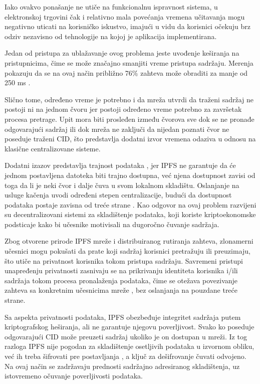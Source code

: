 Iako ovakvo ponašanje ne utiče na funkcionalnu ispravnost sistema, u elektronskoj trgovini čak i relativno mala povećanja vremena učitavanja mogu negativno uticati na korisničko iskustvo, imajući u vidu da korisnici očekuju brz odziv nezavisno od tehnologije na kojoj je aplikacija implementirana.

Jedan od pristupa za ublažavanje ovog problema jeste uvođenje keširanja na pristupnicima, čime se može značajno smanjiti vreme pristupa sadržaju. Merenja pokazuju da se na ovaj način približno 76\% zahteva može obraditi za manje od 250 ms \cite{trautwein2022design}.

Slično tome, određeno vreme je potrebno i da mreža utvrdi da traženi sadržaj ne postoji ni na jednom čvoru jer postoji određeno vreme potrebno za završetak procesa pretrage. Upit mora biti prosleđen između čvorova sve dok se ne pronađe odgovarajući sadržaj ili dok mreža ne zaključi da nijedan poznati čvor ne poseduje traženi CID, što predstavlja dodatni izvor vremena odaziva u odnosu na klasične centralizovane sisteme.

Dodatni izazov predstavlja trajnost podataka , jer IPFS ne garantuje da će jednom postavljena datoteka biti trajno dostupna, već njena dostupnost zavisi od toga da li je neki čvor i dalje čuva u svom lokalnom skladištu. Oslanjanje na usluge kačenja uvodi određeni stepen centralizacije, budući da dostupnost podataka postaje zavisna od treće strane \cite{lamichhane2024verifiable}. Kao odgovor na ovaj problem razvijeni su decentralizovani sistemi za skladištenje podataka, koji koriste kriptoekonomske podsticaje kako bi učesnike motivisali na dugoročno čuvanje sadržaja.

Zbog otvorene prirode IPFS mreže i distribuiranog rutiranja zahteva, zlonamerni učesnici mogu pokušati da prate koji sadržaj korisnici pretražuju ili preuzimaju, što utiče na privatnost korisnika tokom pristupa sadržaju. Savremeni pristupi unapređenju privatnosti zasnivaju se na prikrivanju identiteta korisnika i/ili sadržaja tokom procesa pronalaženja podataka, čime se otežava povezivanje zahteva sa konkretnim učesnicima mreže \cite{katsantas2024enhancing}, bez oslanjanja na pouzdane treće strane.

Sa aspekta privatnosti podataka, IPFS obezbeđuje integritet sadržaja putem kriptografskog heširanja, ali ne garantuje njegovu poverljivost. Svako ko poseduje odgovarajući CID može preuzeti sadržaj ukoliko je on dostupan u mreži. Iz tog razloga IPFS nije pogodan za skladištenje osetljivih podataka u izvornom obliku, već ih treba šifrovati pre postavljanja \cite{manakhari2024enhancing}, a ključ za dešifrovanje čuvati odvojeno. Na ovaj način se zadržavaju prednosti sadržajno adresiranog skladištenja, uz istovremeno očuvanje poverljivosti podataka.

